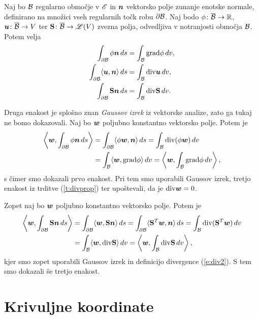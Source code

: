 \begin{izrek} \label{i:divtheo}
	Naj bo $\mathcal B$ regularno območje v $\mathscr E$ in $\boldsymbol n$ vektorsko polje zunanje enotske normale,
	definirano na množici vseh regularnih točk robu $\partial \mathcal B$. Naj bodo $\phi\colon\overline{\mathcal B}\to\mathbb R$,
	$\boldsymbol u\colon\overline{\mathcal B}\to V$ ter $\mathbf S\colon\overline{\mathcal B}\to\mathscr L(V)$
	zvezna polja, odvedljiva v notranjosti območja $\mathcal B$. Potem velja
	\begin{align*}
		\int_{\partial \mathcal B} \phi\boldsymbol n\,ds &= \int_{\mathcal B} \mathrm{grad}\phi\,dv, \\
		\int_{\partial \mathcal B} \langle\boldsymbol u,\boldsymbol n\rangle\,ds &= \int_{\mathcal B} \mathrm{div}\boldsymbol u\,dv, \\
		\int_{\partial \mathcal B} \mathbf S\boldsymbol n\,ds &= \int_{\mathcal B} \mathrm{div}\mathbf S\,dv.
	\end{align*}
\end{izrek}
\proof
	Druga enakost je splošno znan \emph{Gaussov izrek} iz vektorske analize, zato ga tukaj ne bomo dokazovali.
	Naj bo $\boldsymbol w$ poljubno konstantno vektorsko polje. Potem je
	\begin{align*}
		\left<\boldsymbol w,\int_{\partial \mathcal B}\phi\boldsymbol n\,ds\right>
		&= \int_{\partial \mathcal B}\langle\phi\boldsymbol w,\boldsymbol n\rangle\,ds=
		\int_{\mathcal B}\mathrm{div}(\phi\boldsymbol w)\,dv \\
		&= \int_{\mathcal B}\langle\boldsymbol w,\mathrm{grad}\phi\rangle \,dv = \left<\boldsymbol w,\int_{\mathcal B}\mathrm{grad}\phi \,dv\right>,
	\end{align*}
	s čimer smo dokazali prvo enakost.
	Pri tem smo uporabili Gaussov izrek, tretjo enakost iz trditve (\ref{t:divprop}) ter
	upoštevali, da je $\mathrm{div}\boldsymbol w=0$.
	
	Zopet naj bo $\boldsymbol w$ poljubno konstantno vektorsko polje. Potem je
	\begin{align*}
		\left<\boldsymbol w,\int_{\partial \mathcal B}\mathbf S\boldsymbol n\,ds\right>
		&= \int_{\partial \mathcal B}\langle\boldsymbol w,\mathbf S\boldsymbol n\rangle\,ds=
		\int_{\partial \mathcal B}\langle\mathbf S^T\boldsymbol w,\boldsymbol n\rangle\,ds=
		\int_{\mathcal B}\mathrm{div}(\mathbf S^T\boldsymbol w)\,dv \\ &=\int_{\mathcal B}\langle\boldsymbol w,\mathrm{div}\mathbf S\rangle\,dv=
		\left<\boldsymbol w,\int_{\mathcal B}\mathrm{div}\mathbf S\,dv\right>,
	\end{align*}
	kjer smo zopet uporabili Gaussov izrek in definicijo divergence (\ref{e:div2}). S tem smo dokazali še tretjo enakost.
\endproof


\section{Krivuljne koordinate} \label{s:koordinate}


